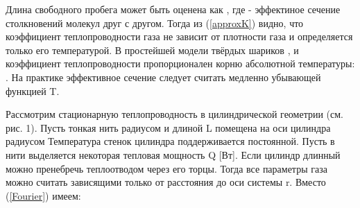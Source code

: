 \noindent\hspace{1cm}Длина свободного пробега может быть оценена как , где \mth{\sigma} - эффектиное сечение столкновений молекул друг с другом. Тогда из (\ref{approxK}) видно, что коэффициент теплопроводности газа не зависит от плотности газа и определяется только его температурой. В простейшей модели твёрдых шариков , и коэффициент теплопроводности пропорционален корню абсолютной температуры: . На практике эффективное сечение  следует считать медленно убывающей функцией T. \\[0.2cm]

\noindent\begin{minipage}[c]{0.54\textwidth}
    \hspace{1cm}Рассмотрим стационарную теплопроводность в цилиндрической геометрии (см. рис. 1). Пусть тонкая нить радиусом  и длиной L помещена на оси цилиндра радиусом  Температура стенок цилиндра  поддерживается постоянной. Пусть в нити выделяется некоторая тепловая мощность Q [Вт]. Если цилиндр длинный  можно пренебречь теплоотводом через его торцы. Тогда все параметры газа можно считать зависящими только от расстояния до оси системы r. Вместо (\ref{Fourier}) имеем:
\end{minipage}
